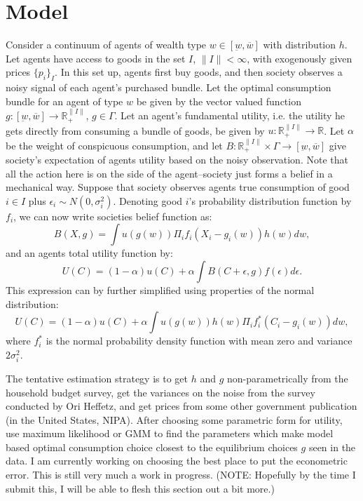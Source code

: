 \documentclass[a4paper,10pt]{article}
\begin{document}
\section{Model}
Consider a continuum of agents of wealth type $w\in[\underbar{w},\overline{w}]$ with distribution $h$.  Let agents have access to goods in the set $I$, $\|I\|<\infty$, with exogenously given prices $\{p_i\}_I$.  In this set up, agents first buy goods, and then society observes a noisy signal of each agent's purchased bundle.  Let the optimal consumption bundle for an agent of type $w$ be given by the vector valued function $g:[\underbar{w},\overline{w}]\rightarrow \mathbb{R}_+^{\|I\|}$, $g\in\Gamma$. Let an agent's fundamental utility, i.e. the utility he gets directly from consuming a bundle of goods, be given by $u:\mathbb{R}_+^{\|I\|}\rightarrow \mathbb{R}$.  Let $\alpha$ be the weight of conspicuous consumption, and let $B:\mathbb{R}_+^{\|I\|}\times \Gamma \rightarrow [\underbar{w},\overline{w}]$ give society's expectation of agents utility based on the noisy observation.  Note that all the action here is on the side of the agent--society just forms a belief in a mechanical way.  Suppose that society observes agents true consumption of good $i\in I$ plus $\epsilon_i \sim N(0,\sigma_i^2)$.  Denoting good $i$'s probability distribution function by $f_i$, we can now write societies belief function as:
\begin{equation}
 B(X,g) = \int u(g(w)) \Pi_i f_i(X_i - g_i(w)) h(w) dw, 
\end{equation}
and an agents total utility function by:
\[ 
 U(C) = (1-\alpha) u(C) + \alpha \int B(C+\epsilon,g) f(\epsilon) d\epsilon.
\]
This expression can by further simplified using properties of the normal distribution:
\begin{equation}
 U(C) = (1-\alpha) u(C) + \alpha \int u(g(w)) h(w) \Pi_i f_i^*(C_i-g_i(w)) dw,
\end{equation}
where $f_i^*$ is the normal probability density function with mean zero and variance $2\sigma_i^2$.

The tentative estimation strategy is to get $h$ and $g$ non-parametrically from the household budget survey, get the variances on the noise from the survey conducted by Ori Heffetz, and get prices from some other government publication (in the United States, NIPA).  After choosing some parametric form for utility, use maximum likelihood or GMM to find the parameters which make model based optimal consumption choice closest to the equilibrium choices $g$ seen in the data.  I am currently working on choosing the best place to put the econometric error.  This is still very much a work in progress. (NOTE: Hopefully by the time I submit this, I will be able to flesh this section out a bit more.)     
\end{document}
